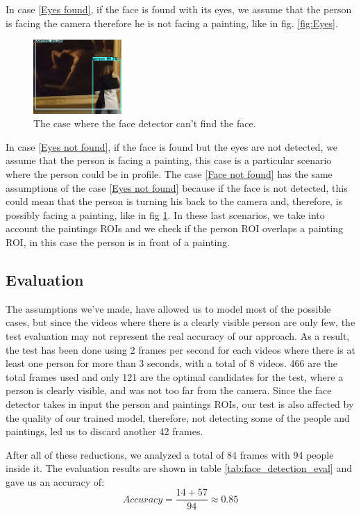 In case \ref*{Eyes found}, if the face is found with its eyes, we assume that the person is facing the camera therefore he is not facing a painting, like in fig. \ref{fig:Eyes}.
\begin{figure}[h!]
    \centering
    \includegraphics[width=0.3\textwidth]{pictures/face_detection/face_det1}
    \caption{The case where the face detector can't find the face.}
    \label{fig:No_eyes}
\end{figure}
In case \ref*{Eyes not found}, if the face is found but the eyes are not detected, we assume that the person is facing a painting, this case is a particular scenario where the person could be in profile. The case \ref*{Face not found} has the same assumptions of the case \ref*{Eyes not found} because if the face is not detected, this could mean that the person is turning his back to the camera and, therefore, is possibly facing a painting, like in fig \ref{fig:No_eyes}. In these last scenarios, we take into account the paintings ROIs and we check if the person ROI overlaps a painting ROI, in this case the person is in front of a painting.

\subsection{Evaluation}
The assumptions we've made, have allowed us to model most of the possible cases, but since the videos where there is a clearly visible person are only few, the test evaluation may not represent the real accuracy of our approach. As a result, the test has been done using 2 frames per second for each videos where there is at least one person for more than 3 seconds, with a total of 8 videos. 466 are the total frames used and only 121 are the optimal candidates for the test, where a person is clearly visible, and was not too far from the camera. Since the face detector takes in input the person and paintings ROIs, our test is also affected by the quality of our trained model, therefore, not detecting some of the people and paintings, led us to discard another 42 frames.

After all of these reductions, we analyzed a total of 84 frames with 94 people inside it. The evaluation results are shown in table \ref{tab:face_detection_eval} and gave us an accuracy of: \[Accuracy = \frac{14+57}{94} \approx 0.85\]

